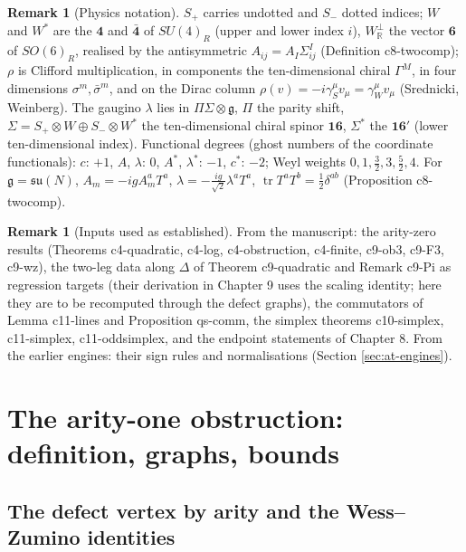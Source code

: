 \documentclass[11pt]{article}
\numberwithin{equation}{section}
\theoremstyle{plain}
\theoremstyle{definition}
\newtheorem{remark}[theorem]{Remark}
\begin{document}
\begin{remark}[Physics notation]
\label{rem:at-phys}
$S_+$ carries undotted and $S_-$ dotted indices; $W$ and $W^*$ are the $\mathbf 4$ and $\bar{\mathbf 4}$ of $SU(4)_R$ (upper and lower index $i$), $W^\perp_{\mathbb R}$ the vector $\mathbf 6$ of $SO(6)_R$, realised by the antisymmetric $A_{ij}=A_I\Sigma^I_{ij}$ (Definition c8-twocomp); $\rho$ is Clifford multiplication, in components the ten-dimensional chiral $\Gamma^M$, in four dimensions $\sigma^m,\bar\sigma^m$, and on the Dirac column $\rho(v)=-i\gamma_S^\mu v_\mu=\gamma_W^\mu v_\mu$ (Srednicki, Weinberg). The gaugino $\lambda$ lies in $\Pi\Sigma\otimes\mathfrak g$, $\Pi$ the parity shift, $\Sigma=S_+\otimes W\oplus S_-\otimes W^*$ the ten-dimensional chiral spinor $\mathbf{16}$, $\Sigma^*$ the $\mathbf{16}'$ (lower ten-dimensional index). Functional degrees (ghost numbers of the coordinate functionals): $c$: $+1$, $A$, $\lambda$: $0$, $A^*$, $\lambda^*$: $-1$, $c^*$: $-2$; Weyl weights $0,1,\tfrac32,3,\tfrac52,4$. For $\mathfrak g=\mathfrak{su}(N)$, $A_m=-igA^a_mT^a$, $\lambda=-\tfrac{ig}{\sqrt2}\lambda^aT^a$, $\operatorname{tr}T^aT^b=\tfrac12\delta^{ab}$ (Proposition c8-twocomp).
\end{remark}

\begin{remark}[Inputs used as established]
\label{rem:at-inputs}
From the manuscript: the arity-zero results (Theorems c4-quadratic, c4-log, c4-obstruction, c4-finite, c9-ob3, c9-F3, c9-wz), the two-leg data along $\Delta$ of Theorem c9-quadratic and Remark c9-Pi as regression targets (their derivation in Chapter 9 uses the scaling identity; here they are to be recomputed through the defect graphs), the commutators of Lemma c11-lines and Proposition qs-comm, the simplex theorems c10-simplex, c11-simplex, c11-oddsimplex, and the endpoint statements of Chapter 8. From the earlier engines: their sign rules and normalisations (Section \ref{sec:at-engines}).
\end{remark}

\section{The arity-one obstruction: definition, graphs, bounds}
\label{sec:at-ob1}

\subsection{The defect vertex by arity and the Wess--Zumino identities}
\end{document}
